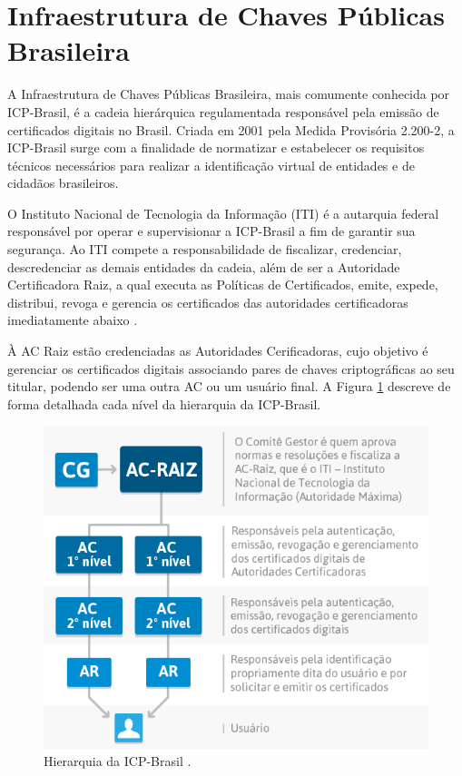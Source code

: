 \section{Infraestrutura de Chaves Públicas Brasileira}

A Infraestrutura de Chaves Públicas Brasileira, mais comumente conhecida por ICP-Brasil, é a cadeia hierárquica regulamentada  responsável pela emissão de certificados digitais no Brasil. Criada em 2001 pela Medida Provisória 2.200-2, a ICP-Brasil surge com a finalidade de normatizar e estabelecer os requisitos técnicos necessários para realizar a identificação virtual de entidades e de cidadãos brasileiros.

O Instituto Nacional de Tecnologia da Informação (ITI) é a autarquia federal responsável por operar e supervisionar a ICP-Brasil a fim de garantir sua segurança. Ao ITI compete a responsabilidade de fiscalizar, credenciar, descredenciar as demais entidades da cadeia, além de ser a Autoridade Certificadora Raiz, a qual executa as Políticas de Certificados, emite, expede, distribui, revoga e gerencia os certificados das autoridades certificadoras imediatamente abaixo \cite{ICPBrasi30}.

À AC Raiz estão credenciadas as Autoridades Cerificadoras, cujo objetivo é gerenciar os certificados digitais associando pares de chaves criptográficas ao seu titular, podendo ser uma outra AC ou um usuário final. A Figura \ref{hierarquia} descreve de forma detalhada cada nível da hierarquia da ICP-Brasil.

\begin{figure}[h]
	\centering
	\includegraphics[keepaspectratio=true,scale=0.6]{figuras/hierarquia ICP-Brasil.png}
	\caption{Hierarquia da ICP-Brasil \cite{hierarquiaICP}.}
	\label{hierarquia}
\end{figure}

 